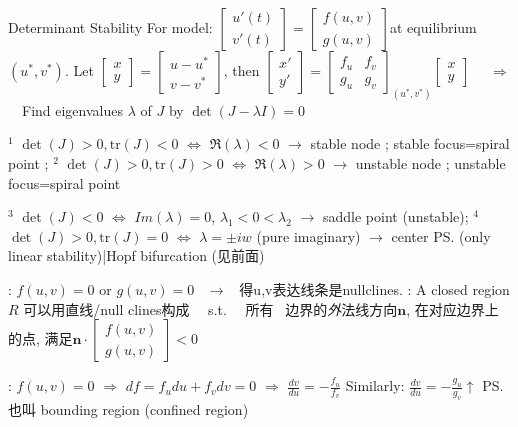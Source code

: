 \documentclass{note}
\begin{document}
\begin{MyTh}{Determinant Stability}
    \scriptsize
    For model: $\left[\begin{smallmatrix}u'(t) \\ v'(t)\end{smallmatrix}\right]=\left[\begin{smallmatrix}f(u,v) \\ g(u,v)\end{smallmatrix}\right]${\tiny at equilibrium $(u^*,v^*)$}. Let $\left[\begin{smallmatrix}x \\ y\end{smallmatrix}\right]=\left[\begin{smallmatrix}u-u^* \\ v-v^*\end{smallmatrix}\right]$, then $\left[\begin{smallmatrix}x' \\ y'\end{smallmatrix}\right]=\left[\begin{smallmatrix}f_u & f_v \\ g_u & g_v\end{smallmatrix}\right]_{(u^*,v^*)}\left[\begin{smallmatrix}x \\ y\end{smallmatrix}\right]$
    \ \ $\Rightarrow$ \ \ Find eigenvalues $\lambda$ of $J$ by $\det(J-\lambda I)=0$

    \quad $^1$ $\det(J)>0, \text{tr}(J)<0$ $\Leftrightarrow$ $\Re(\lambda)<0$ $\rightarrow$ stable node ; stable focus=spiral point ; $^2$ $\det(J)>0, \text{tr}(J)>0$ $\Leftrightarrow$ $\Re(\lambda)>0$ $\rightarrow$ unstable node ; unstable focus=spiral point 

    \quad $^3$ $\det(J)<0$ $\Leftrightarrow$ $Im(\lambda)=0$, $\lambda_1<0<\lambda_2$ $\rightarrow$ saddle point (unstable); $^4$ $\det(J)>0, \text{tr}(J)=0$ $\Leftrightarrow$ $\lambda=\pm iw$ (pure imaginary) $\rightarrow$ center \ps{\tiny (only linear stability)}|Hopf bifurcation (见前面)

    \quad {}: $f(u,v)=0$ or $g(u,v)=0$ \ $\to$ \ {\tiny 得u,v表达线条是nullclines.}
    \quad {}: {\tiny A closed region $R$ \tiny{可以用直线/null clines构成} \ \ s.t. \ \ 所有 \ 边界的\textit{外}法线方向$\mathbf{n}$, 在对应边界上的点, 满足$\mathbf{n}\cdot\left[\begin{smallmatrix}f(u,v) \\ g(u,v)\end{smallmatrix}\right]<0$}

    \vspace{-2pt}
    \quad {}: $f(u,v)=0$ $\Rightarrow$ $df=f_u du+f_v dv=0$ $\Rightarrow$ $\frac{dv}{du}=-\frac{f_u}{f_v}$ \qquad Similarly: $\frac{dv}{du}=-\frac{g_u}{g_v}$\hspace{100pt}$\uparrow$ \ps{\tiny 也叫 bounding region (confined region)}
\end{MyTh}
\end{document}
